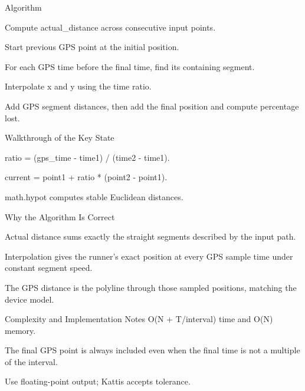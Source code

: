 \documentclass[aspectratio=169,11pt]{beamer}
\begin{document}
\begin{frame}{Algorithm}
\begin{tightitemize}
  \item Compute actual\_distance across consecutive input points.
  \item Start previous GPS point at the initial position.
  \item For each GPS time before the final time, find its containing segment.
  \item Interpolate x and y using the time ratio.
  \item Add GPS segment distances, then add the final position and compute percentage lost.
\end{tightitemize}
\end{frame}

\begin{frame}{Walkthrough of the Key State}
\begin{tightitemize}
  \item ratio = (gps\_time - time1) / (time2 - time1).
  \item current = point1 + ratio * (point2 - point1).
  \item math.hypot computes stable Euclidean distances.
\end{tightitemize}
\end{frame}

\begin{frame}{Why the Algorithm Is Correct}
\begin{tightitemize}
  \item Actual distance sums exactly the straight segments described by the input path.
  \item Interpolation gives the runner's exact position at every GPS sample time under constant segment speed.
  \item The GPS distance is the polyline through those sampled positions, matching the device model.
\end{tightitemize}
\end{frame}

\begin{frame}{Complexity and Implementation Notes}
\small
{} O(N + T/interval) time and O(N) memory.

\vspace{0.3cm}
\begin{tightitemize}
  \item The final GPS point is always included even when the final time is not a multiple of the interval.
  \item Use floating-point output; Kattis accepts tolerance.
\end{tightitemize}
\end{frame}
\end{document}
